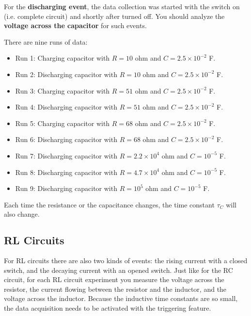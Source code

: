 For the \textbf{discharging event}, the data collection was started with the switch on (i.e. complete circuit) and shortly after turned off. You should analyze the \textbf{voltage across the capacitor} for such events.

There are nine runs of data:
\begin{itemize}
    \item Run 1: Charging capacitor with $R = 10$ ohm and $C = 2.5 \times 10^{-2}$ F.
	\item Run 2: Discharging capacitor with $R = 10$ ohm and $C = 2.5 \times 10^{-2}$ F.
	\item Run 3: Charging capacitor with $R = 51$ ohm and $C = 2.5 \times 10^{-2}$ F.
	\item Run 4: Discharging capacitor with $R = 51$ ohm and $C = 2.5 \times 10^{-2}$ F.
	\item Run 5: Charging capacitor with $R = 68$ ohm and $C = 2.5 \times 10^{-2}$ F.
	\item Run 6: Discharging capacitor with $R = 68$ ohm and $C = 2.5 \times 10^{-2}$ F.
	\item Run 7: Discharging capacitor with $R = 2.2 \times 10^{4}$ ohm and $C = 10^{-5}$ F.
	\item Run 8: Discharging capacitor with $R = 4.7 \times 10^{4}$ ohm and $C = 10^{-5}$ F.
	\item Run 9: Discharging capacitor with $R = 10^{5}$ ohm and $C = 10^{-5}$ F.
\end{itemize}
Each time the resistance or the capacitance changes, the time constant $\tau_{C}$ will also change.
\subsection{RL Circuits}
For RL circuits there are also two kinds of events: the rising current with a closed switch, and the decaying current with an opened switch. Just like for the RC circuit, for each RL circuit experiment you measure the voltage across the resistor, the current flowing between the resistor and the inductor, and the voltage across the inductor. Because the inductive time constants are so small, the data acquisition needs to be activated with the triggering feature.

